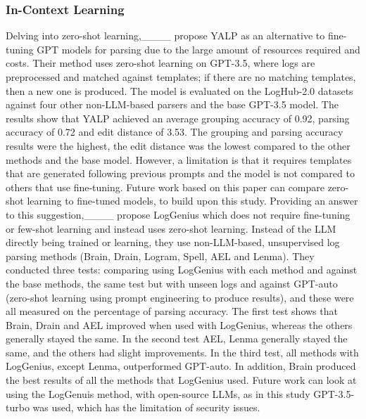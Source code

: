 \subsubsection{In-Context Learning}
Delving into zero-shot learning,____ propose YALP as an alternative to fine-tuning GPT models for parsing due to the large amount of resources required and costs. Their method uses zero-shot learning on GPT-3.5, where logs are preprocessed and matched against templates; if there are no matching templates, then a new one is produced. The model is evaluated on the LogHub-2.0 datasets against four other non-LLM-based parsers and the base GPT-3.5 model. The results show that YALP achieved an average grouping accuracy of 0.92, parsing accuracy of 0.72 and edit distance of 3.53. The grouping and parsing accuracy results were the highest, the edit distance was the lowest compared to the other methods and the base model. However, a limitation is that it requires templates that are generated following previous prompts and the model is not compared to others that use fine-tuning. Future work based on this paper can compare zero-shot learning to fine-tuned models, to build upon this study. Providing an answer to this suggestion,____ propose LogGenius which does not require fine-tuning or few-shot learning and instead uses zero-shot learning. Instead of the LLM directly being trained or learning, they use non-LLM-based, unsupervised log parsing methods (Brain, Drain, Logram, Spell, AEL and Lenma). They conducted three tests: comparing using LogGenius with each method and against the base methods, the same test but with unseen logs and against GPT-auto (zero-shot learning using prompt engineering to produce results), and these were all measured on the percentage of parsing accuracy. The first test shows that Brain, Drain and AEL improved when used with LogGenius, whereas the others generally stayed the same. In the second test AEL, Lenma generally stayed the same, and the others had slight improvements. In the third test, all methods with LogGenius, except Lenma, outperformed GPT-auto. In addition, Brain produced the best results of all the methods that LogGenius used. Future work can look at using the LogGenuis method, with open-source LLMs, as in this study GPT-3.5-turbo was used, which has the limitation of security issues.   

